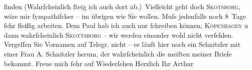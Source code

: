 \begin{ledgroupsized}[t]{13cm}
               finden (Wahrſcheinlich ſteig ich {\pb}auch dort
               ab.) Vielleicht geht doch \textsc{Skotsborg}, wäre mir ſympathiſcher – im übrigen wie Sie wollen. Muſs jedenfalls noch
               8 Tage ſehr fleißig arbeiten. Dem Paul hab
               ich auch nur ſchreiben können, \textsc{Kopenhagen} u dann wahrſcheinlich \textsc{Skottsborg} – wir werden einander wohl nicht verfehlen. Vergeſſen Sie Vornamen auf Telegr.
               nicht – es läuft hier noch ein Schnitzler mit
               einer Frau A. Schnitzler herum, der
               wahrſcheinlich die meiſten meiner Briefe bekommt. Freue mich ſehr auf Wiederſehen\pend
           \pstart Herzlich Ihr \spacefill\mbox{Arthur}\pend{}\endnumbering{}\end{ledgroupsized}  \newcommand{\dateiname}{L00571}\newcommand{\titel}{Arthur Schnitzler an Richard Beer-Hofmann, 29. 7. 1896}\newcommand{\editorInnen}{Martin Anton Müller und Gerd-Hermann Susen}
      